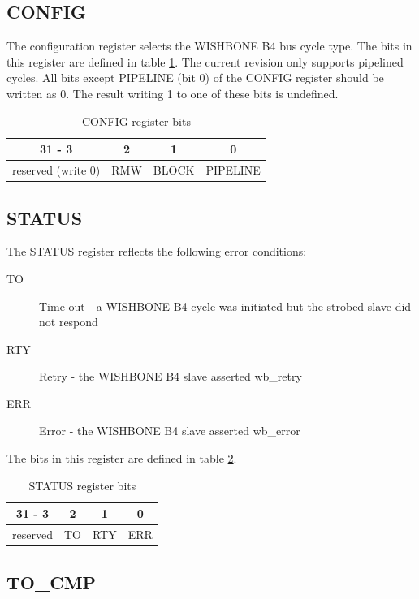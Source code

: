 \documentclass[a4paper,twocolumn,12pt]{article}
\begin{document}
\subsection{CONFIG}

The configuration register selects the WISHBONE B4 \cite{wishbone} bus cycle type. The bits in this register are defined in table \ref{tab:config_bits}. The current revision only supports pipelined cycles. All bits except PIPELINE (bit 0) of the CONFIG register should be written as 0. The result writing 1 to one of these bits is undefined.

\begin{table}[h]
\label{tab:config_bits}
\begin{tabular}{| c | c | c | c |
}
    \hline
    31 - 3 & 2 & 1 & 0 \\ \hline \hline
    reserved (write 0) & RMW & BLOCK & PIPELINE \\ \hline
\end{tabular}
\caption{CONFIG register bits}
\end{table}

\subsection{STATUS}

The STATUS register reflects the following error conditions:

\begin{description}
    \item[TO] Time out - a WISHBONE B4 cycle was initiated but the strobed slave did not respond
    \item[RTY] Retry - the WISHBONE B4 slave asserted wb\_retry
    \item[ERR] Error - the WISHBONE B4 slave asserted wb\_error
\end{description}

The bits in this register are defined in table \ref{tab:status_bits}.

\begin{table}[h]
\label{tab:status_bits}
\begin{tabular}{| c | c | c | c |
}
    \hline
    31 - 3 & 2 & 1 & 0 \\ \hline \hline
    reserved & TO & RTY & ERR \\ \hline
\end{tabular}
\caption{STATUS register bits}
\end{table}

\subsection{TO\_CMP}
\end{document}
